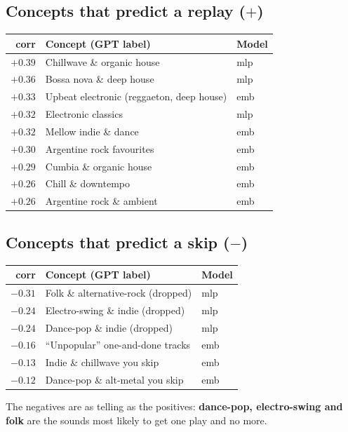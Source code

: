 \documentclass[11pt]{article}
\begin{document}
\subsection{Concepts that predict a replay ($+$)}
\begin{center}
\begin{tabular}{@{}rll@{}}
\toprule
corr & Concept (GPT label) & Model \\
\midrule
$+0.39$ & Chillwave \& organic house & mlp \\
$+0.36$ & Bossa nova \& deep house & mlp \\
$+0.33$ & Upbeat electronic (reggaeton, deep house) & emb \\
$+0.32$ & Electronic classics & mlp \\
$+0.32$ & Mellow indie \& dance & emb \\
$+0.30$ & Argentine rock favourites & emb \\
$+0.29$ & Cumbia \& organic house & emb \\
$+0.26$ & Chill \& downtempo & emb \\
$+0.26$ & Argentine rock \& ambient & emb \\
\bottomrule
\end{tabular}
\end{center}

\subsection{Concepts that predict a skip ($-$)}
\begin{center}
\begin{tabular}{@{}rll@{}}
\toprule
corr & Concept (GPT label) & Model \\
\midrule
$-0.31$ & Folk \& alternative-rock (dropped) & mlp \\
$-0.24$ & Electro-swing \& indie (dropped) & mlp \\
$-0.24$ & Dance-pop \& indie (dropped) & mlp \\
$-0.16$ & ``Unpopular'' one-and-done tracks & emb \\
$-0.13$ & Indie \& chillwave you skip & emb \\
$-0.12$ & Dance-pop \& alt-metal you skip & emb \\
\bottomrule
\end{tabular}
\end{center}

The negatives are as telling as the positives: \textbf{dance-pop, electro-swing
and folk} are the sounds most likely to get one play and no more.
\end{document}
